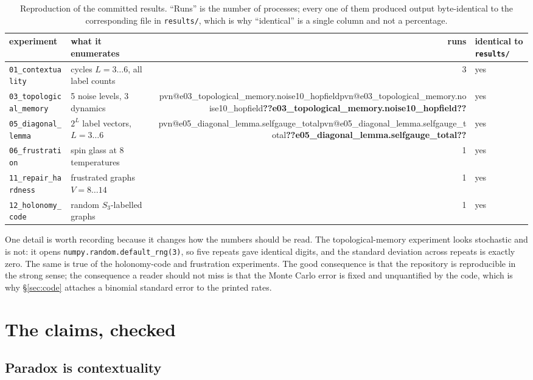 \documentclass[11pt,a4paper]{article}
\makeatletter
\newcommand{\valn}[1]{\ifcsname pvn@#1\endcsname\csname pvn@#1\endcsname\else\textbf{??#1??}\fi}
\makeatother
\begin{document}
\begin{table}[t]
\centering
\small
\begin{tabular}{llrl}
\toprule
experiment & what it enumerates & runs & identical to \texttt{results/\allowbreak{}} \\
\midrule
\texttt{01\_\allowbreak{}contextuality} & cycles $L=3\ldots6$, all label counts & 3 & yes \\
\texttt{03\_\allowbreak{}topological\_\allowbreak{}memory} & 5 noise levels, 3 dynamics & \valn{e03_topological_memory.noise10_hopfield} & yes \\
\texttt{05\_\allowbreak{}diagonal\_\allowbreak{}lemma} & $2^L$ label vectors, $L=3\ldots6$ & \valn{e05_diagonal_lemma.selfgauge_total} & yes \\
\texttt{06\_\allowbreak{}frustration} & spin glass at 8 temperatures & 1 & yes \\
\texttt{11\_\allowbreak{}repair\_\allowbreak{}hardness} & frustrated graphs $V=8\ldots14$ & 1 & yes \\
\texttt{12\_\allowbreak{}holonomy\_\allowbreak{}code} & random $S_3$-labelled graphs & 1 & yes \\
\bottomrule
\end{tabular}
\caption{Reproduction of the committed results. ``Runs'' is the number of processes; every one of
them produced output byte-identical to the corresponding file in \texttt{results/\allowbreak{}}, which is why
``identical'' is a single column and not a percentage.}
\label{tab:repro}
\end{table}

One detail is worth recording because it changes how the numbers should be read. The
topological-memory experiment looks stochastic and is not: it opens
\texttt{numpy.random.default\_\allowbreak{}rng(3)}, so five repeats gave identical digits, and the standard
deviation across repeats is exactly zero. The same is true of the holonomy-code and frustration
experiments. The good consequence is that the repository is reproducible in the strong sense; the
consequence a reader should not miss is that the Monte Carlo error is fixed and unquantified by
the code, which is why \S\ref{sec:code} attaches a binomial standard error to the printed rates.

\section{The claims, checked}
\label{sec:claims}

\subsection{Paradox is contextuality}
\end{document}
